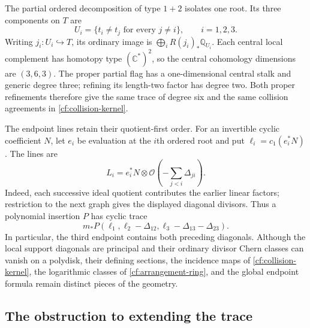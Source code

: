 The partial ordered decomposition of type $1+2$ isolates one root.
Its three components on $T$ are
\[
 U_i=\{t_i\ne t_j\text{ for every }j\ne i\},\qquad i=1,2,3.
\]
Writing $j_i:U_i\hookrightarrow T$, its ordinary image is
$\bigoplus_iR(j_i)_*\mathbb Q_{U_i}$.
Each central local complement has homotopy type $(\mathbb C^*)^2$,
so the central cohomology dimensions are $(3,6,3)$.
The proper partial flag has a one-dimensional central stalk and
generic degree three; refining its length-two factor has degree two.
Both proper refinements therefore give the same trace of degree six
and the same collision agreements in \eqref{cf:collision-kernel}.

The endpoint lines retain their quotient-first order. For an
invertible cyclic coefficient $N$, let $e_i$ be evaluation at the
$i$th ordered root and put $\ell_i=c_1(e_i^*N)$. The lines are
\begin{equation}\label{cf:endpoint-lines}
 L_i=e_i^*N\otimes
       \mathcal O\left(-\sum_{j<i}\Delta_{ji}\right).
\end{equation}
Indeed, each successive ideal quotient contributes the earlier
linear factors; restriction to the next graph gives the displayed
diagonal divisors. Thus a polynomial insertion $P$ has cyclic trace
\[
 m_*P(\ell_1,\ell_2-\Delta_{12},
                \ell_3-\Delta_{13}-\Delta_{23}).
\]
In particular, the third endpoint contains both preceding diagonals.
Although the local support diagonals are principal and their ordinary
divisor Chern classes can vanish on a polydisk, their defining sections,
the incidence maps of \eqref{cf:collision-kernel}, the logarithmic
classes of \eqref{cf:arrangement-ring}, and the global endpoint
formula remain distinct pieces of the geometry.

\subsection{The obstruction to extending the trace}

